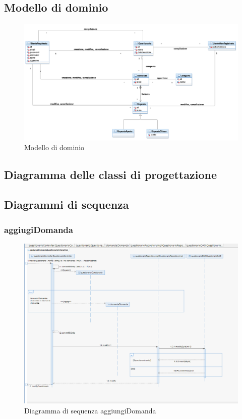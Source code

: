 \documentclass[12pt]{article}
\begin{document}
\subsection{Modello di dominio}
\begin{figure}[H]
\centering
\includegraphics[scale=0.5]{UNIMIBModule_UniMiBModuleDomainLayer.png}
\caption{Modello di dominio}
\end{figure}
\subsection{Diagramma delle classi di progettazione}
\subsection{Diagrammi di sequenza}
\subsubsection{aggiugiDomanda}
\begin{figure}[H]
\centering
\includegraphics[scale=0.7]{UNIMIBModule_aggiungiDomandaQuestionarioSequenceDiagram.png}
\caption{Diagramma di sequenza aggiungiDomanda}
\end{figure}
\end{document}
